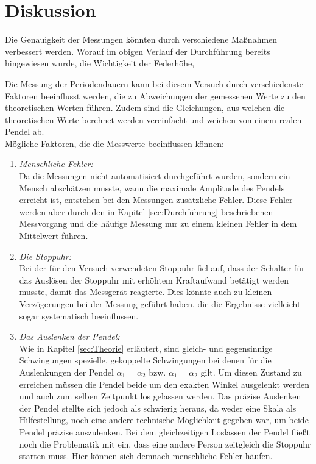 \section{Diskussion}
  Die Genauigkeit der Messungen könnten durch verschiedene Maßnahmen verbessert werden. Worauf im obigen Verlauf der
  Durchführung bereits hingewiesen wurde, die Wichtigkeit der Federhöhe, 
\label{sec:Diskussion}

Die Messung der Periodendauern kann bei diesem Versuch durch verschiedenste Faktoren beeinflusst werden, die zu Abweichungen
der gemessenen Werte zu den theoretischen Werten führen. Zudem sind die Gleichungen, aus welchen die theoretischen Werte 
berehnet werden vereinfacht und weichen von einem realen Pendel ab.\\ 
Mögliche Faktoren, die die Messwerte beeinflussen können:
\begin{enumerate}
    \item \textit{Menschliche Fehler:}\\
        Da die Messungen nicht automatisiert durchgeführt wurden, sondern ein Mensch abschätzen musste, wann die maximale 
        Amplitude des Pendels erreicht ist, entstehen bei den Messungen zusätzliche Fehler. Diese Fehler werden aber durch den in Kapitel
        \ref{sec:Durchführung} beschriebenen Messvorgang und die häufige Messung nur zu einem kleinen Fehler in dem Mittelwert
        führen.
    \item \textit{Die Stoppuhr:}\\
        Bei der für den Versuch verwendeten Stoppuhr fiel auf, dass der Schalter für das Auslösen der Stoppuhr mit erhöhtem 
        Kraftaufwand betätigt werden musste, damit das Messgerät reagierte. Dies könnte auch zu kleinen Verzögerungen bei der 
        Messung geführt haben, die die Ergebnisse vielleicht sogar systematisch beeinflussen.
    \item \textit{Das Auslenken der Pendel:}\\
        Wie in Kapitel \ref{sec:Theorie} erläutert, sind gleich- und gegensinnige Schwingungen spezielle, gekoppelte Schwingungen bei 
        denen für die Auslenkungen der Pendel $\alpha_1=\alpha_2$ bzw. $\alpha_1=\alpha_2$ gilt. Um diesen Zustand zu erreichen
        müssen die Pendel beide um den exakten Winkel ausgelenkt werden und auch zum selben Zeitpunkt los gelassen werden. Das 
        präzise Auslenken der Pendel stellte sich jedoch als schwierig heraus, da weder eine Skala als Hilfestellung, noch 
        eine andere technische Möglichkeit gegeben war, um beide Pendel präzise auszulenken. Bei dem gleichzeitigen Loslassen
        der Pendel fließt noch die Problematik mit ein, dass eine andere Person zeitgleich die Stoppuhr starten muss. Hier 
        können sich demnach menschliche Fehler häufen.
\end{enumerate}
